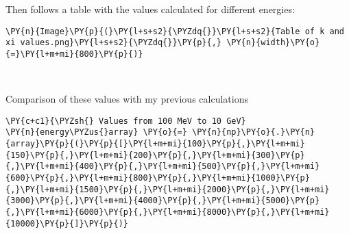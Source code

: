     Then follows a table with the values calculated for different energies:

    \begin{tcolorbox}[breakable, size=fbox, boxrule=1pt, pad at break*=1mm,colback=cellbackground, colframe=cellborder]
\begin{Verbatim}[commandchars=\\\{\}]
\PY{n}{Image}\PY{p}{(}\PY{l+s+s2}{\PYZdq{}}\PY{l+s+s2}{Table of k and xi values.png}\PY{l+s+s2}{\PYZdq{}}\PY{p}{,} \PY{n}{width}\PY{o}{=}\PY{l+m+mi}{800}\PY{p}{)}
\end{Verbatim}
\end{tcolorbox}
 
            
    
    \begin{center}
    \end{center}
    { \hspace*{\fill} \\}
    

    Comparison of these values with my previous calculations

    \begin{tcolorbox}[breakable, size=fbox, boxrule=1pt, pad at break*=1mm,colback=cellbackground, colframe=cellborder]
\begin{Verbatim}[commandchars=\\\{\}]
\PY{c+c1}{\PYZsh{} Values from 100 MeV to 10 GeV}
\PY{n}{energy\PYZus{}array} \PY{o}{=} \PY{n}{np}\PY{o}{.}\PY{n}{array}\PY{p}{(}\PY{p}{[}\PY{l+m+mi}{100}\PY{p}{,}\PY{l+m+mi}{150}\PY{p}{,}\PY{l+m+mi}{200}\PY{p}{,}\PY{l+m+mi}{300}\PY{p}{,}\PY{l+m+mi}{400}\PY{p}{,}\PY{l+m+mi}{500}\PY{p}{,}\PY{l+m+mi}{600}\PY{p}{,}\PY{l+m+mi}{800}\PY{p}{,}\PY{l+m+mi}{1000}\PY{p}{,}\PY{l+m+mi}{1500}\PY{p}{,}\PY{l+m+mi}{2000}\PY{p}{,}\PY{l+m+mi}{3000}\PY{p}{,}\PY{l+m+mi}{4000}\PY{p}{,}\PY{l+m+mi}{5000}\PY{p}{,}\PY{l+m+mi}{6000}\PY{p}{,}\PY{l+m+mi}{8000}\PY{p}{,}\PY{l+m+mi}{10000}\PY{p}{]}\PY{p}{)}
\end{Verbatim}
\end{tcolorbox}

